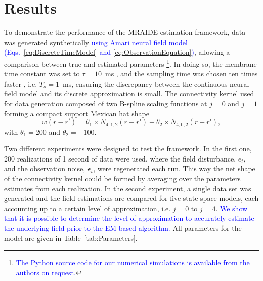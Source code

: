 \documentclass[review,authoryear,3p]{elsarticle}
\newcommand{\parham}[1]{\textcolor{blue}{#1}}
\begin{document}
\section{Results}\label{sec:MRA-results}
To demonstrate the performance of the MRAIDE estimation framework, data was generated synthetically \parham{using Amari neural field model  (Eqs.~\eqref{eq:DiscreteTimeModel} and \eqref{eq:ObservationEquation})}, allowing a comparison between true and estimated parameters \footnote{\parham{The Python source code for our numerical simulations is available from the authors on request.}}. In doing so, the membrane time constant was set to $\tau = 10$~ms \citep{David2003}, and the sampling time was chosen ten times faster \citep{Stephan2008}, i.e. $T_s = 1$~ms, ensuring the discrepancy between the continuous neural field model and its discrete approximation is small. The connectivity kernel used for data generation composed of two B-spline scaling functions at $j=0$ and $j=1$ forming a compact support Mexican hat shape 
\begin{equation}\label{eq:ConnectivityKernelForData}
	w(r-r')=\theta_1\times N_{4;1,2}(r-r')+\theta_2\times N_{4;0,2}(r-r'),
\end{equation}
with $\theta_1=200$ and $\theta_2=-100$. 

Two different experiments were designed to test the framework. In the first one, 200 realizations of 1 second of data were used, where the field disturbance, $e_t$, and the observation noise, $\boldsymbol\epsilon_t$, were regenerated each run. This way the net shape of the connectivity kernel could be formed by averaging over the parameters estimates from each realization. In the second experiment, a single data set was generated and the field estimations are compared for five state-space models, each accounting up to a certain level of approximation, i.e. $j=0$ to $j=4$. \parham{We show that it is possible to determine the level of approximation to accurately estimate the underlying field prior to the EM based algorithm.} All parameters for the model are given in Table~\ref{tab:Parameters}.
\end{document}
